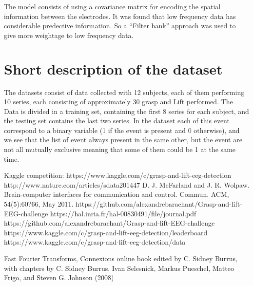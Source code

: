 \documentclass[final,leqno,onefignum,onetabnum]{siamltexmm}
\begin{document}
The model consists of using a covariance matrix for encoding the spatial information between the electrodes.  It was found that low frequency data has considerable predective information.  So a ``Filter bank'' approach was used to give more weightage to low frequency data.

\section{Short description of the dataset}
The  datasets consist of data collected with 12 subjects, each of them performing 10 series, each consisting of approximately 30 grasp and Lift performed. The Data is divided in a  training set, containing the first 8 series for each subject, and  the testing set contains the last two series.
In the dataset each of this event correspond to a binary variable (1 if the event is present and 0 otherwise), and we see that the list of event always present in the same other, but the event are not all mutually exclusive meaning that some of  them could be 1 at the same time.  

\begin{thebibliography}{1}
   Kaggle competition:  https://www.kaggle.com/c/grasp-and-lift-eeg-detection
   http://www.nature.com/articles/sdata201447
  D. J. McFarland and J. R. Wolpaw. Brain-computer interfaces for communication and control. Commun. ACM, 54(5):60?66, May 2011.
  https://github.com/alexandrebarachant/Grasp-and-lift-EEG-challenge
  https://hal.inria.fr/hal-00830491/file/journal.pdf
  https://github.com/alexandrebarachant/Grasp-and-lift-EEG-challenge
  https://www.kaggle.com/c/grasp-and-lift-eeg-detection/leaderboard
  https://www.kaggle.com/c/grasp-and-lift-eeg-detection/data

  Fast Fourier Transforms, Connexions online book edited by C. Sidney Burrus, with chapters by C. Sidney Burrus, Ivan Selesnick, Markus Pueschel, Matteo Frigo, and Steven G. Johnson (2008)
\end{thebibliography} 
\end{document}
